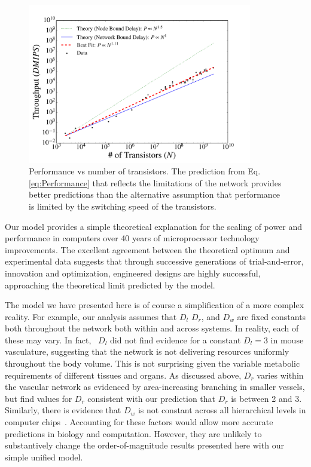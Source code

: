 \documentclass[12pt]{article}
\begin{document}
\begin{figure}[!h]
\centering
\includegraphics[height=70mm]{Figures/ChipsThroughputScaling.pdf}
\caption{Performance vs number of transistors. The prediction from Eq. \ref{eq:Performance} that reflects the limitations of the network provides better predictions than the alternative assumption that performance is limited by the switching speed of the transistors.}
\label{fig:throughput}
\end{figure}

Our model provides a simple theoretical explanation for the scaling of power
and performance in computers over 40 years of microprocessor technology
improvements.  The excellent agreement between the theoretical optimum and
experimental data suggests that through successive generations of
trial-and-error, innovation and optimization, engineered designs are highly
successful, approaching the theoretical limit predicted by the model.

The model we have presented here is of course a simplification of a more complex reality. For example, our analysis assumes that $D_l$ $D_r$, and $D_w$ are fixed constants both throughout the network both within and across systems. In reality, each of these may vary. In fact,~\cite{newberry2015testing} $D_l$ did not find evidence for a constant $D_l = 3$ in mouse vasculature, suggesting that the network is not delivering resources uniformly throughout the body volume. This is not surprising given the variable metabolic requirements of different tissues and organs. As discussed above, $D_r$ varies within the vascular network as evidenced by area-increasing branching in smaller vessels, but \cite{newberry2015testing} find values for $D_r$ consistent with our prediction that $D_r$ is between 2 and 3. Similarly, there is evidence that $D_w$ is not constant across all hierarchical levels in computer chips~\cite{ozaktas2004information}. Accounting for these factors would allow more accurate predictions in biology and computation.  However, they are unlikely to substantively change the order-of-magnitude results presented here with our simple unified model. 
\end{document}
